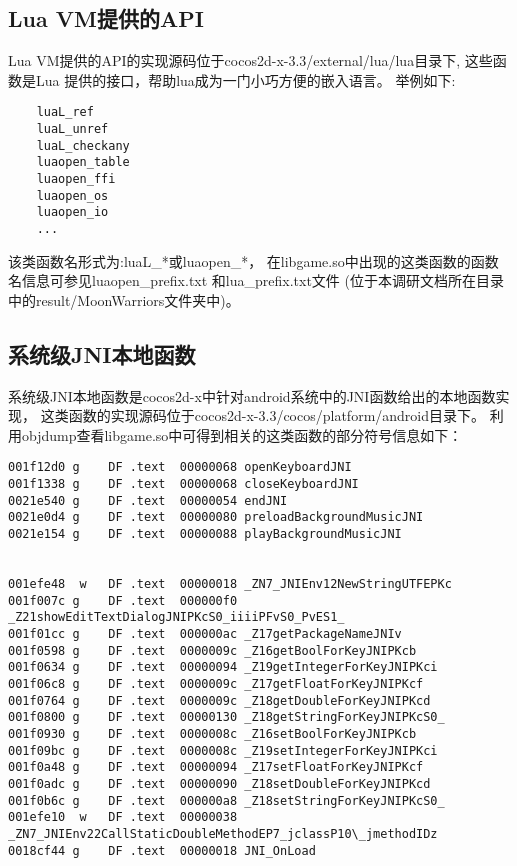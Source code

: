 \subsection{Lua VM提供的API}
\label{sec:so:lualib}

Lua VM提供的API的实现源码位于cocos2d-x-3.3/external/lua/lua目录下,
这些函数是Lua 提供的接口，帮助lua成为一门小巧方便的嵌入语言。
举例如下:
\begin{lstlisting}
	luaL_ref
	luaL_unref
	luaL_checkany
	luaopen_table
	luaopen_ffi
	luaopen_os
	luaopen_io
	...
\end{lstlisting}
该类函数名形式为:luaL\_*或luaopen\_*，
在libgame.so中出现的这类函数的函数名信息可参见luaopen\_prefix.txt
和lua\_prefix.txt文件
(位于本调研文档所在目录中的result/MoonWarriors文件夹中)。

\subsection{系统级JNI本地函数}
\label{sec:so:sysjnilib}
系统级JNI本地函数是cocos2d-x中针对android系统中的JNI函数给出的本地函数实现，
这类函数的实现源码位于cocos2d-x-3.3/cocos/platform/android目录下。
利用objdump查看libgame.so中可得到相关的这类函数的部分符号信息如下：
\begin{lstlisting}
001f12d0 g    DF .text  00000068 openKeyboardJNI
001f1338 g    DF .text  00000068 closeKeyboardJNI
0021e540 g    DF .text  00000054 endJNI
0021e0d4 g    DF .text  00000080 preloadBackgroundMusicJNI
0021e154 g    DF .text  00000088 playBackgroundMusicJNI


001efe48  w   DF .text  00000018 _ZN7_JNIEnv12NewStringUTFEPKc
001f007c g    DF .text  000000f0 _Z21showEditTextDialogJNIPKcS0_iiiiPFvS0_PvES1_
001f01cc g    DF .text  000000ac _Z17getPackageNameJNIv
001f0598 g    DF .text  0000009c _Z16getBoolForKeyJNIPKcb
001f0634 g    DF .text  00000094 _Z19getIntegerForKeyJNIPKci
001f06c8 g    DF .text  0000009c _Z17getFloatForKeyJNIPKcf
001f0764 g    DF .text  0000009c _Z18getDoubleForKeyJNIPKcd
001f0800 g    DF .text  00000130 _Z18getStringForKeyJNIPKcS0_
001f0930 g    DF .text  0000008c _Z16setBoolForKeyJNIPKcb
001f09bc g    DF .text  0000008c _Z19setIntegerForKeyJNIPKci
001f0a48 g    DF .text  00000094 _Z17setFloatForKeyJNIPKcf
001f0adc g    DF .text  00000090 _Z18setDoubleForKeyJNIPKcd
001f0b6c g    DF .text  000000a8 _Z18setStringForKeyJNIPKcS0_
001efe10  w   DF .text  00000038 _ZN7_JNIEnv22CallStaticDoubleMethodEP7_jclassP10\_jmethodIDz
0018cf44 g    DF .text  00000018 JNI_OnLoad
\end{lstlisting}

